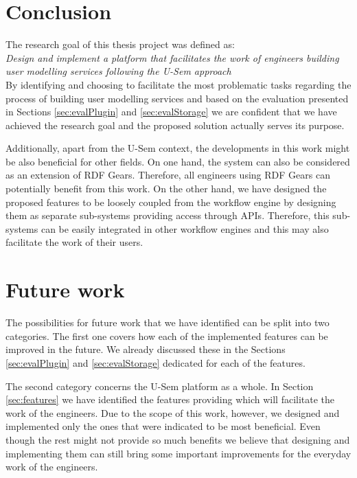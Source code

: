 \section{Conclusion}
\label{sec:concDisc}

The research goal of this thesis project was defined as:\\

\textit{Design and implement a platform that facilitates the work of engineers building user modelling services following the U-Sem approach}\\

By identifying and choosing to facilitate the most problematic tasks regarding the process of building user modelling services  and based on the evaluation presented in Sections \ref{sec:evalPlugin} and \ref{sec:evalStorage} we are confident that we have achieved the research goal and the proposed solution actually serves its purpose.

Additionally, apart from the U-Sem context, the developments in this work might be also beneficial for other fields. On one hand, the system can also be considered as an extension of RDF Gears. Therefore, all engineers using RDF Gears can potentially benefit from this work. On the other hand, we have designed the proposed features to be loosely coupled from the workflow engine by designing them as separate sub-systems providing access through APIs. Therefore, this sub-systems can be easily integrated in other workflow engines and this may also facilitate the work of their users.

\section{Future work}
\label{sec:concFuture}

The possibilities for future work that we have identified can be split into two categories. The first one covers how each of the implemented features can be improved in the future. We already discussed these in the Sections \ref{sec:evalPlugin} and \ref{sec:evalStorage} dedicated for each of the features. 

The second category concerns the U-Sem platform as a whole. In Section \ref{sec:features} we have identified the features providing which will facilitate the work of the engineers. Due to the scope of this work, however, we designed and implemented only the ones that were indicated to be most beneficial. Even though the rest might not provide so much benefits we believe that designing and implementing them can still bring some important improvements for the everyday work of the engineers.
